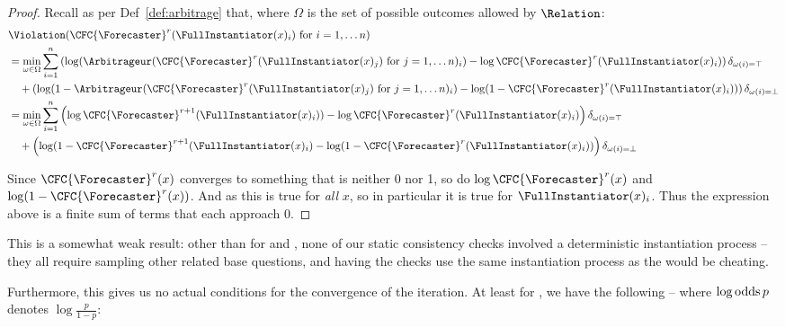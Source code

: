 \begin{proof}
Recall as per Def~\ref{def:arbitrage} that, where $\Omega$ is the set of possible outcomes allowed by $\Relation$:
\begin{align*}
&\Violation(\CFC{\Forecaster}^r(\FullInstantiator(x)_i)\text{ for }i=1,\dots n)\\
&=\min_{\omega\in\Omega}\sum_{i=1}^n \left(\log(\Arbitrageur(\CFC{\Forecaster}^r(\FullInstantiator(x)_j)\text{ for }j=1,\dots n)_i)-\log\CFC{\Forecaster}^r(\FullInstantiator(x)_i)\right)\delta_{\omega(i)=\top}\\
&\quad+
\left(\log(1-\Arbitrageur(\CFC{\Forecaster}^r(\FullInstantiator(x)_j)\text{ for }j=1,\dots n)_i)-\log(1-\CFC{\Forecaster}^r(\FullInstantiator(x)_i))\right)\delta_{\omega(i)=\bot}\\
&=\min_{\omega\in\Omega}\sum_{i=1}^n \left(\log\CFC{\Forecaster}^{r+1}(\FullInstantiator(x)_i))-\log\CFC{\Forecaster}^r(\FullInstantiator(x)_i)\right)\delta_{\omega(i)=\top}\\
&\quad+
\left(\log(1-\CFC{\Forecaster}^{r+1}(\FullInstantiator(x)_i)-\log(1-\CFC{\Forecaster}^r(\FullInstantiator(x)_i))\right)\delta_{\omega(i)=\bot}
\end{align*}

Since $\CFC{\Forecaster}^r(x)$ converges to something that is neither 0 nor 1, so do $\log\CFC{\Forecaster}^r(x)$ and $\log(1-\CFC{\Forecaster}^r(x))$. And as this is true for \emph{all} $x$, so in particular it is true for $\FullInstantiator(x)_i$. Thus the expression above is a finite sum of terms that each approach 0.
\end{proof}

This is a somewhat weak result: other than for \NegChecker{} and \ParaphraseChecker{}, none of our static consistency checks involved a deterministic instantiation process -- they all require sampling other related base questions, and having the checks use the same instantiation process as the \CFCaster{} would be cheating.


Furthermore, this gives us no actual conditions for the convergence of the iteration. At least for \ParaphraseChecker{}, we have the following -- where $\log\operatorname{odds} p$ denotes $\log\frac{p}{1-p}$:

